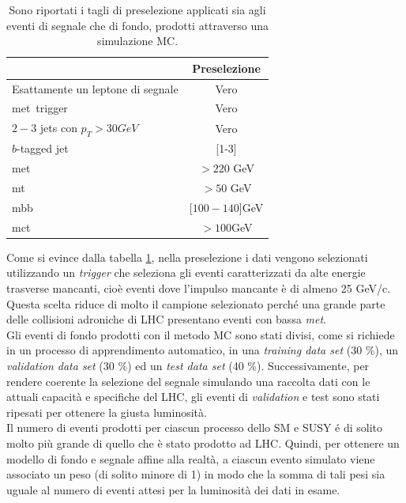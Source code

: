 \begin{table}[h!]
	\centering
	\begin{tabular}{lc}
		\hline
		&Preselezione \\
		\hline
		Esattamente un leptone di segnale&Vero\\
		met\ trigger&Vero\\
		$2-3$ jets con $p_{T}>30 GeV$&Vero\\
		$b$-tagged jet&[1-3]\\
		met\ &$> 220$ GeV\\
		mt\ &$> 50$ GeV\\
		mbb\ &[$100-140$]GeV\\
		mct\ &$>100$GeV\\
		\hline
	\end{tabular}
	\caption{Sono riportati i tagli di preselezione applicati sia agli eventi di segnale che di fondo, prodotti attraverso una simulazione MC.}
	\label{tab:tagli di preselezione}
\end{table}
Come si evince dalla tabella \ref{tab:tagli di preselezione}, nella preselezione i dati vengono selezionati utilizzando un \textit{trigger} che seleziona gli eventi caratterizzati da alte energie trasverse mancanti, cioè eventi dove l'impulso mancante è di almeno 25 GeV/c. Questa scelta riduce di molto il campione selezionato perché una grande parte delle collisioni adroniche di LHC presentano eventi con bassa \textit{met}. \\
Gli eventi di fondo prodotti con il metodo MC sono stati divisi, come si richiede in un processo di apprendimento automatico, in una \textit{training data set} (30 \%), un \textit{validation data set} (30 \%) ed un \textit{test data set} (40 \%). Successivamente, per rendere coerente la selezione del segnale simulando una raccolta dati con le attuali capacità e specifiche del LHC, gli eventi di \textit{validation} e test sono stati ripesati per ottenere la giusta luminosità.\\
Il numero di eventi prodotti per ciascun processo dello SM e SUSY é di solito molto più grande di quello che è stato prodotto ad LHC. Quindi, per ottenere un modello di fondo e segnale affine alla realtà, a ciascun evento simulato viene associato un peso (di solito minore di 1) in modo che la somma di tali pesi sia uguale al numero di eventi attesi per la luminosità dei dati in esame.




